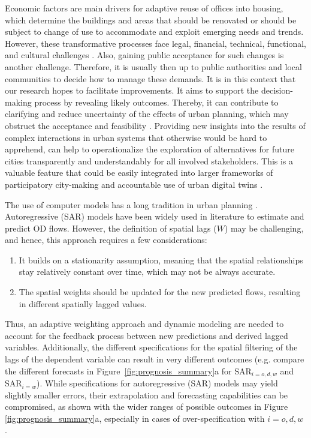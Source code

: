 Economic factors are main drivers for adaptive reuse of offices into housing, which determine the buildings and areas that should be renovated or should be subject to change of use to accommodate and exploit emerging needs and trends. 
However, these transformative processes face legal, financial, technical, functional, and cultural challenges \citep{Remy2014}.
Also, gaining public acceptance for such changes is another challenge. Therefore, it is usually then up to public authorities and local communities to decide how to manage these demands. It is in this context that our research hopes to facilitate improvements. It aims to support the decision-making process by revealing likely outcomes. Thereby, it can contribute to clarifying and reduce uncertainty of the effects of urban planning, which may obstruct the  acceptance and feasibility 
\citep{Wustenhagen2007SocialConcept}. Providing new insights into the results of complex interactions in urban systems that otherwise would be hard to apprehend, can help to operationalize the exploration of alternatives for future cities transparently and understandably for all involved stakeholders. This is a valuable feature that could be easily integrated into larger frameworks of participatory city-making and accountable use of urban digital twins \citep{Helbing2023, Bettencourt2024RecentTwins, Ferre-Bigorra2022TheTwins}.  %

The use of computer models has a long tradition in urban planning \citep{Wegener2021Land-UseModels}. Autoregressive (SAR) models have been widely used in literature to estimate and predict OD flows. However, the definition of spatial lags ($W$) may be challenging, and hence, this approach requires a few considerations:
\begin{enumerate}
    \item It builds on a stationarity assumption, meaning that the spatial relationships stay relatively constant over time, which may not be always accurate. 
    \item The spatial weights should be updated for the new predicted flows, resulting in different spatially lagged values. 
\end{enumerate}
Thus, an adaptive weighting approach and dynamic modeling are needed to account for the feedback process between new predictions and derived lagged variables. Additionally, the different specifications for the spatial filtering of the lags of the dependent variable can result in very different outcomes (e.g. compare the different forecasts in Figure~\ref{fig:prognosis_summary}a for $\text{SAR}_{i=o,d,w}$ and $\text{SAR}_{i=w}$). While specifications for autoregressive (SAR) models may yield slightly smaller errors, their extrapolation and forecasting capabilities can be compromised, as shown with the wider ranges of possible outcomes in Figure \ref{fig:prognosis_summary}a, especially in cases of over-specification with $i=o,d,w$ \citep{Griffith2020SomeModels}.

